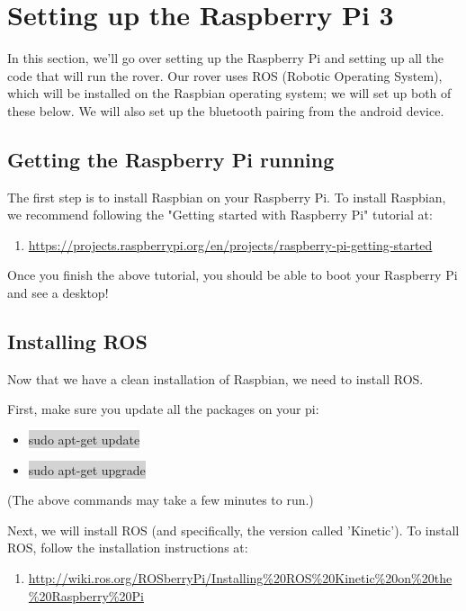 \documentclass{article}
\begin{document}
\section{Setting up the Raspberry Pi 3}
In this section, we'll go over setting up the Raspberry Pi and setting up all the code that will run the rover. Our rover uses ROS (Robotic Operating System), which will be installed on the Raspbian operating system; we will set up both of these below.  We will also set up the bluetooth pairing from the android device.

\subsection{Getting the Raspberry Pi running}
The first step is to install Raspbian on your Raspberry Pi. To install Raspbian,
we recommend following the "Getting started with Raspberry Pi" tutorial at:

\begin{enumerate}
	\item[] \href{https://projects.raspberrypi.org/en/projects/raspberry-pi-getting-started}{https://projects.raspberrypi.org/en/projects/raspberry-pi-getting-started}
\end{enumerate}

Once you finish the above tutorial, you should be able to boot your Raspberry Pi and see a desktop!




\subsection{Installing ROS}
Now that we have a clean installation of Raspbian, we need to install ROS.

First, make sure you update all the packages on your pi:
\begin{itemize}
	\item[] \colorbox{lightgray}{sudo apt-get update}
	\item[] \colorbox{lightgray}{sudo apt-get upgrade}
\end{itemize} 
(The above commands may take a few minutes to run.)

Next, we will install ROS (and specifically, the version called 'Kinetic').  To install ROS, follow the installation instructions at:
\begin{enumerate}
	\item[] \href{http://wiki.ros.org/ROSberryPi/Installing%20ROS%20Kinetic%20on%20the%20Raspberry%20Pi}{http://wiki.ros.org/ROSberryPi/Installing\%20ROS\%20Kinetic\%20on\%20the\%20Raspberry\%20Pi}
\end{enumerate}
\end{document}
